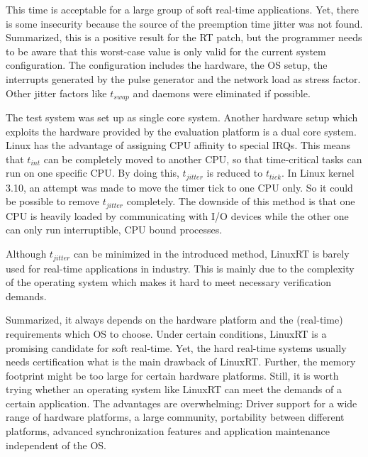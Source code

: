 This time is acceptable for a large group of soft real-time applications.
Yet, there is some insecurity because the source of the preemption time jitter was not found. 
Summarized, this is a positive result for the RT patch, but the programmer needs to be aware that this worst-case value is only valid for the current system configuration. 
The configuration includes the hardware, the \ac{OS} setup, the interrupts generated by the pulse generator and the network load as stress factor.
Other jitter factors like $t_{swap}$ and daemons were eliminated if possible.
\par
The test system was set up as single core system.
Another hardware setup which exploits the hardware provided by the evaluation platform is a dual core system. 
Linux has the advantage of assigning \ac{CPU} affinity to special \acp{IRQ}.
This means that $t_{int}$ can be completely moved to another \ac{CPU}, so that time-critical tasks can run on one specific \ac{CPU}.
By doing this, $t_{jitter}$ is reduced to $t_{tick}$.
In Linux kernel 3.10, an attempt was made to move the timer tick to one \ac{CPU} only.
So it could be possible to remove $t_{jitter}$ completely.
The downside of this method is that one \ac{CPU} is heavily loaded by communicating with \ac{I/O} devices while the other one can only run interruptible, \ac{CPU} bound processes.
\par
Although $t_{jitter}$ can be minimized in the introduced method, LinuxRT is barely used for real-time applications in industry.
This is mainly due to the complexity of the operating system which makes it hard to meet necessary verification demands.
\par
Summarized, it always depends on the hardware platform and the (real-time) requirements which \ac{OS} to choose.
Under certain conditions, LinuxRT is a promising candidate for soft real-time.
Yet, the hard real-time systems usually needs certification what is the main drawback of LinuxRT. 
Further, the memory footprint might be too large for certain hardware platforms. 
Still, it is worth trying whether an operating system like LinuxRT can meet the demands of a certain application.
The advantages are overwhelming: Driver support for a wide range of hardware platforms, a large community, portability between different platforms, advanced synchronization features and application maintenance independent of the \ac{OS}.